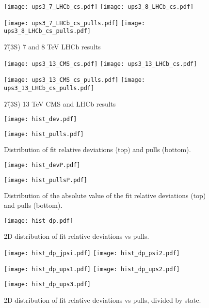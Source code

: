 \documentclass{article}
\begin{document}
\clearpage

\begin{figure}
\centering
\texttt{[image: ups3\_7\_LHCb\_cs.pdf]}
\texttt{[image: ups3\_8\_LHCb\_cs.pdf]}

\texttt{[image: ups3\_7\_LHCb\_cs\_pulls.pdf]}
\texttt{[image: ups3\_8\_LHCb\_cs\_pulls.pdf]}
\caption{$\Upsilon$(3S) 7 and 8 TeV LHCb results}
\end{figure}

\clearpage

\begin{figure}
\centering
\texttt{[image: ups3\_13\_CMS\_cs.pdf]}
\texttt{[image: ups3\_13\_LHCb\_cs.pdf]}

\texttt{[image: ups3\_13\_CMS\_cs\_pulls.pdf]}
\texttt{[image: ups3\_13\_LHCb\_cs\_pulls.pdf]}
\caption{$\Upsilon$(3S) 13 TeV CMS and LHCb results}
\end{figure}

\clearpage

\begin{figure}
\centering
\texttt{[image: hist\_dev.pdf]}

\texttt{[image: hist\_pulls.pdf]}
\caption{Distribution of fit relative deviations (top) and pulls (bottom).}
\end{figure}

\clearpage

\begin{figure}
\centering
\texttt{[image: hist\_devP.pdf]}

\texttt{[image: hist\_pullsP.pdf]}
\caption{Distribution of the absolute value of the fit relative deviations (top) and pulls (bottom).}
\end{figure}

\clearpage

\begin{figure}
\centering
\texttt{[image: hist\_dp.pdf]}
\caption{2D distribution of fit relative deviations vs pulls.}
\end{figure}

\clearpage

\begin{figure}
\centering
\texttt{[image: hist\_dp\_jpsi.pdf]}
\texttt{[image: hist\_dp\_psi2.pdf]}

\texttt{[image: hist\_dp\_ups1.pdf]}
\texttt{[image: hist\_dp\_ups2.pdf]}

\texttt{[image: hist\_dp\_ups3.pdf]}
\caption{2D distribution of fit relative deviations vs pulls, divided by state.}
\end{figure}
\end{document}
